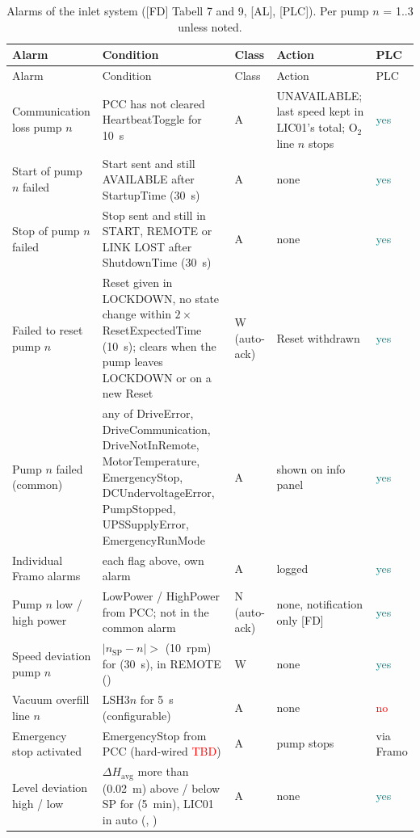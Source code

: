 \documentclass[11pt,a4paper]{article}
\newcommand{\TBD}{\textcolor{red}{TBD}}
\newcommand{\impl}{\textcolor{teal}{\textsf{yes}}}
\newcommand{\notimpl}{\textcolor{red}{\textsf{no}}}
\begin{document}
\begin{small}
\begin{longtable}{@{}P{34mm}P{46mm}P{9mm}P{34mm}P{20mm}@{}}
\caption{Alarms of the inlet system ([FD] Tabell 7 and 9, [AL], [PLC]). Per pump $n$ = 1..3 unless
noted.}\label{tab:alarms}\\
\toprule
Alarm & Condition & Class & Action & PLC \\
\midrule
\endfirsthead
\toprule
Alarm & Condition & Class & Action & PLC \\
\midrule
\endhead
\bottomrule
\endfoot
Communication loss pump $n$ & PCC has not cleared HeartbeatToggle for 10~s & A & UNAVAILABLE; last speed kept in LIC01's total; O$_2$ line $n$ stops & \impl \\
Start of pump $n$ failed & Start sent and still AVAILABLE after StartupTime (30~s) & A & none & \impl \\
Stop of pump $n$ failed & Stop sent and still in START, REMOTE or LINK LOST after ShutdownTime (30~s) & A & none & \impl \\
Failed to reset pump $n$ & Reset given in LOCKDOWN, no state change within $2\times$ResetExpectedTime (10~s); clears when the pump leaves LOCKDOWN or on a new Reset & W (auto-ack) & Reset withdrawn & \impl \\
Pump $n$ failed (common) & any of DriveError, DriveCommunication, DriveNotInRemote, MotorTemperature, EmergencyStop, DCUndervoltageError, PumpStopped, UPSSupplyError, EmergencyRunMode & A & shown on info panel & \impl{} \\
Individual Framo alarms & each flag above, own alarm & A & logged & \impl \\
Pump $n$ low / high power & LowPower / HighPower from PCC; not in the common alarm & N (auto-ack) & none, notification only [FD] & \impl \\
Speed deviation pump $n$ & $|n_\text{SP}-n| >$  (10~rpm) for  (30~s), in REMOTE () & W & none & \impl \\
Vacuum overfill line $n$ & LSH3$n$ for 5~s (configurable) & A & none & \notimpl{} \\
Emergency stop activated & EmergencyStop from PCC (hard-wired \TBD) & A & pump stops & via Framo \\
Level deviation high / low & $\Delta H_\text{avg}$ more than  (0.02~m) above / below SP for  (5~min), LIC01 in auto (, ) & A & none & \impl \\

\end{longtable}
\end{small}
\end{document}
